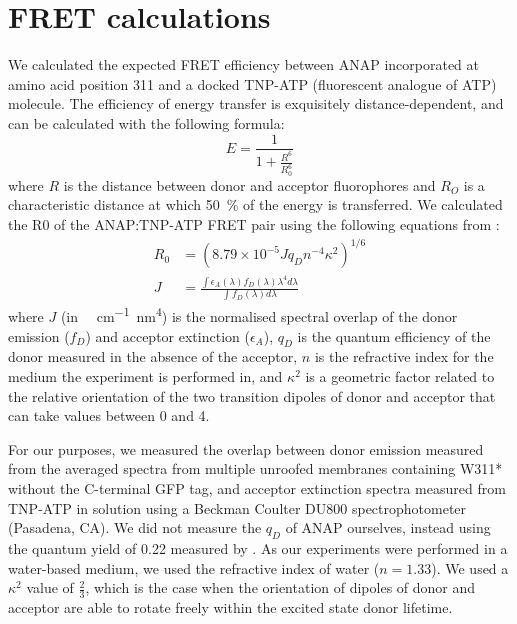 \section{FRET calculations}
We calculated the expected FRET efficiency between ANAP incorporated at amino acid position 311 and a docked TNP-ATP (fluorescent analogue of ATP) molecule.
The efficiency of energy transfer is exquisitely distance-dependent, and can be calculated with the following formula:
\begin{equation} \label{eq:forster_fret}
E = \frac{1}{1 + \frac{R^6}{R_0^6}}
\end{equation}
where $R$ is the distance between donor and acceptor fluorophores and $R_O$ is a characteristic distance at which \SI{50}{\percent} of the energy is transferred.
We calculated the R0 of the ANAP:TNP-ATP FRET pair using the following equations from \textcite{selvin_13_1995}:
\begin{equation} \label{eq:selvin_fret}
\begin{split}
R_0 &= (8.79 \times 10^{-5} J q_D n^{-4} \kappa^2)^{1/6}\\
J &= \frac{\int \epsilon_A (\lambda) f_D (\lambda) \lambda^4 d \lambda}{\int f_D (\lambda) d \lambda}
\end{split}
\end{equation}
where $J$ (in \si{\per\Molar\per\centi\metre\nano\metre}\textsuperscript{4}) is the normalised spectral overlap of the donor emission ($f_D$) and acceptor extinction ($\epsilon_A$), $q_D$ is the quantum efficiency of the donor measured in the absence of the acceptor, $n$ is the refractive index for the medium the experiment is performed in, and $\kappa^2$ is a geometric factor related to the relative orientation of the two transition dipoles of donor and acceptor that can take values between 0 and 4.

For our purposes, we measured the overlap between donor emission measured from the averaged spectra from multiple unroofed membranes containing W311* without the C-terminal GFP tag, and acceptor extinction spectra measured from TNP-ATP in solution using a Beckman Coulter DU800 spectrophotometer (Pasadena, CA).
We did not measure the $q_D$ of ANAP ourselves, instead using the quantum yield of 0.22 measured by \textcite{zagotta_measuring_2016}.
As our experiments were performed in a water-based medium, we used the refractive index of water ($n = 1.33$).
We used a $\kappa^2$ value of $\frac{2}{3}$, which is the case when the orientation of dipoles of donor and acceptor are able to rotate freely within the excited state donor lifetime.

